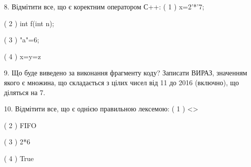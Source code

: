 \documentclass[11pt]{article}
\begin{document}

8. %
Відмітити все, що є коректним оператором С++:
( 1 ) x=2'*'7;

( 2 ) int f(int n);

( 3 ) "a"=6;

( 4 ) x=y=z


9. Що буде виведено за виконання фрагменту коду?
Записати ВИРАЗ, значенням якого є множина, що складається з цілих чисел від 11 до 2016 (включно), що діляться на 7.

10. %
Відмітити все, що є однією правильною лексемою:
( 1 ) <>

( 2 ) FIFO

( 3 ) 2*6

( 4 ) True


\newpage
\end{document}
